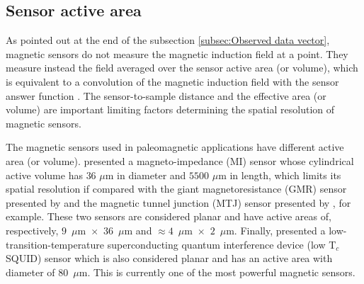 \documentclass[galley,gc]{agutex}
\begin{document}
\begin{article}
\subsection{Sensor active area}
\label{subsec:Sensor active area}

As pointed out at the end of the subsection 
\ref{subsec:Observed data vector}, 
magnetic sensors do not measure the magnetic induction 
field at a point. They measure instead the field averaged 
over the sensor active area (or volume), which is equivalent to a 
convolution of the magnetic induction field with 
the sensor answer function \citep{roth1989, egli2000, lima2013}.
The sensor-to-sample distance and the effective area (or volume) 
are important limiting factors determining the spatial resolution 
of magnetic sensors.

The magnetic sensors used in paleomagnetic applications have
different active area (or volume). 
\citet{uehara2007, uehara2008} presented a magneto-impedance (MI) 
sensor whose cylindrical active volume has $36$ $\mu$m in diameter and 
$5500$ $\mu$m in length, which limits its spatial resolution
if compared with the giant magnetoresistance 
(GMR) sensor presented by \citet{hankard2009} and the magnetic 
tunnel junction (MTJ) sensor presented by \citet{lima2014}, for example.
These two sensors are considered planar and have active areas
of, respectively, $9$~$\mu$m~$\times$~$36$~$\mu$m and 
$\approx 4$~$\mu$m~$\times$~$2$~$\mu$m.
Finally, \citet{fong2005} presented a low-transition-temperature 
superconducting quantum interference device (low T$_{c}$ SQUID) sensor
which is also considered planar and has an active area with
diameter of $80$~$\mu$m.
This is currently one of the most powerful magnetic sensors.


\end{article}
\end{document}
